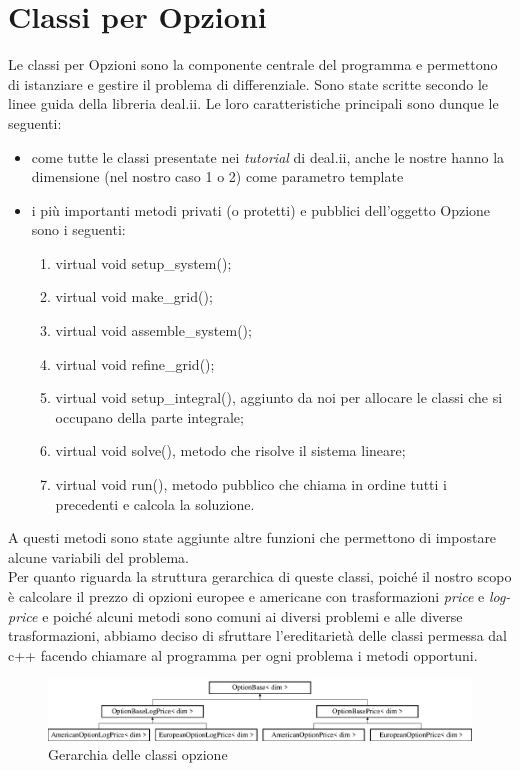 \documentclass[a4paper,10pt]{report}
\theoremstyle{plain}
\theoremstyle{definition}
\theoremstyle{remark}
\begin{document}
\section{Classi per Opzioni}
Le classi per Opzioni sono la componente centrale del programma e permettono di istanziare e gestire il problema di differenziale. Sono state scritte secondo le linee guida della libreria \textsf{deal.ii}. Le loro caratteristiche principali sono dunque le seguenti:
\begin{itemize}
\item {come tutte le classi presentate nei \emph{tutorial} di \textsf{deal.ii}, anche le nostre hanno la dimensione (nel nostro caso 1 o 2) come parametro \textsf{template}}
\item {i pi\`u importanti metodi privati (o protetti) e pubblici dell'oggetto Opzione sono i seguenti:}
\begin{enumerate}
\item \textsf{virtual void setup\_system()};
\item \textsf{virtual void make\_grid()};
\item \textsf{virtual void assemble\_system()};
\item \textsf{virtual void refine\_grid()};
\item \textsf{virtual void setup\_integral()}, aggiunto da noi per allocare le classi che si occupano della parte integrale;
\item \textsf{virtual void solve()}, metodo che risolve il sistema lineare;
\item \textsf{virtual void run()}, metodo pubblico che chiama in ordine tutti i precedenti e calcola la soluzione.
\end{enumerate}
\end{itemize}
A questi metodi sono state aggiunte altre funzioni che permettono di impostare alcune variabili del problema.\\Per quanto riguarda la struttura gerarchica di queste classi, poich\'e il nostro scopo \`e calcolare il prezzo di opzioni europee e americane con trasformazioni \emph{price} e \emph{log-price} e poich\'e alcuni metodi sono comuni ai diversi problemi e alle diverse trasformazioni, abbiamo deciso di sfruttare l'ereditariet\`a delle classi permessa dal c++ facendo chiamare al programma per ogni problema i metodi opportuni.
\begin{figure}[h!]
\begin{center}
\includegraphics[width=12cm]{img/classOptionBase.eps}
\caption{Gerarchia delle classi opzione}
\end{center}
\label{optionbase}
\end{figure}
\end{document}
